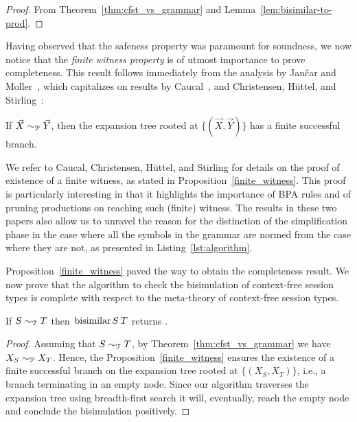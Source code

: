 \begin{proof}
  From Theorem~\ref{thm:cfst_vs_grammar} and
  Lemma~\ref{lem:bisimilar-to-prod}.
\end{proof}

Having observed that the safeness property was paramount for
soundness, we now notice that the \emph{finite witness property} is of
utmost importance to prove completeness. This result follows
immediately from the analysis by Jan{\v{c}}ar and
Moller~\cite{janvcar1999techniques}, which capitalizes on results by
Caucal~\cite{caucal1986decidabilite}, and Christensen, H{\"{u}}ttel, and
Stirling~\cite{DBLP:journals/iandc/ChristensenHS95}:

\begin{proposition} 
\label{finite_witness}
	If $\vec X \sim_\mathcal P \vec Y$, then the expansion tree rooted at
	$\{(\vec X, \vec Y)\}$ has a finite successful branch.
\end{proposition}

We refer to Caucal, Christensen, H{\"{u}}ttel, and Stirling for
details on the proof of existence of a finite witness, as stated in
Proposition~\ref{finite_witness}. This proof is particularly
interesting in that it highlights the importance of BPA rules and of
pruning productions on reaching such (finite) witness. The results in
these two papers also allow us to unravel the reason for the
distinction of the simplification phase in the case where all the
symbols in the grammar are normed from the case where they are not, as
presented in Listing~\ref{lst:algorithm}.

Proposition~\ref{finite_witness} paved the way to obtain the completeness result. 
We now prove that the algorithm to check the bisimulation of context-free session 
types is complete with respect to the meta-theory of context-free session
types.

\begin{theorem}
  If $S \sim_\mathcal T T$ then $\bisimf S T$ returns
  .
\end{theorem}

\begin{proof}
  Assuming that $S \sim_\mathcal T T$, by Theorem~\ref{thm:cfst_vs_grammar}
  we have $X_{S} \sim_\mathcal P X_{T}$.  Hence, the Proposition~\ref{finite_witness}
  ensures the existence of a finite successful branch on the
  expansion tree rooted at $\{(X_{S},X_{T})\}$, i.e., a branch
  terminating in an empty node.  Since our algorithm traverses the
  expansion tree using breadth-first search it will, eventually, reach
  the empty node and conclude the bisimulation positively.
\end{proof}

